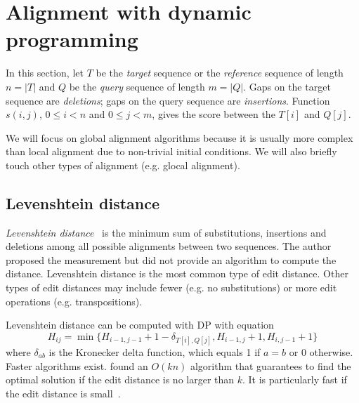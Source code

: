 \documentclass{bioinfo}
\begin{document}
\section{Alignment with dynamic programming}

In this section, let $T$ be the \emph{target} sequence or the \emph{reference}
sequence of length $n=|T|$ and $Q$ be the \emph{query} sequence of length
$m=|Q|$. Gaps on the target sequence are \emph{deletions}; gaps on the query
sequence are \emph{insertions}. Function $s(i,j)$, $0\le i<n$ and $0\le j<m$,
gives the score between the $T[i]$ and $Q[j]$.

We will focus on global alignment algorithms because it is usually more complex
than local alignment due to non-trivial initial conditions. We will also
briefly touch other types of alignment (e.g. glocal alignment).

\subsection{Levenshtein distance}

\emph{Levenshtein distance}~\citep{Levenshtein:1966aa} is the minimum sum of
substitutions, insertions and deletions among all possible alignments between
two sequences. The author proposed the measurement but did not provide an
algorithm to compute the distance. Levenshtein distance is the most common type
of edit distance. Other types of edit distances may include fewer (e.g. no
substitutions) or more edit operations (e.g. transpositions).

Levenshtein distance can be computed with DP with equation
\begin{equation}\label{eq:ed}
H_{ij}=\min\{H_{i-1,j-1}+1-\delta_{T[i],Q[j]}, H_{i-1,j}+1, H_{i,j-1}+1\}
\end{equation}
where $\delta_{ab}$ is the Kronecker delta function, which equals 1 if $a=b$ or
0 otherwise.  Faster algorithms exist.  \citet{Landau:1986aa} found an $O(kn)$
algorithm that guarantees to find the optimal solution if the edit distance is
no larger than $k$. It is particularly fast if the edit distance is
small~\citep{Sosic:2015aa}.
\end{document}
